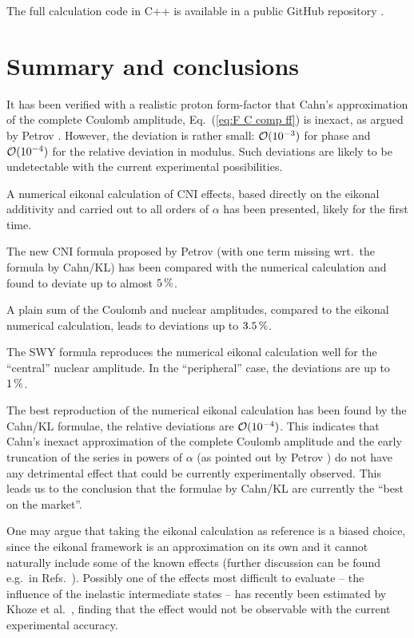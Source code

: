 \documentclass{appolb}
\def\un#1{\,{\rm #1}}
\begin{document}
The full calculation code in C++ is available in a public GitHub repository \cite{code}.




\section{Summary and conclusions}
\label{sec:summary}

It has been verified with a realistic proton form-factor that Cahn's approximation of the complete Coulomb amplitude, Eq.~(\ref{eq:F C comp ff}) is inexact, as argued by Petrov \cite{petrov2018}. However, the deviation is rather small: ${\cal O}(10^{-3})$ for phase and ${\cal O}(10^{-4})$ for the relative deviation in modulus. Such deviations are likely to be undetectable with the current experimental possibilities.

A numerical eikonal calculation of CNI effects, based directly on the eikonal additivity and carried out to all orders of $\alpha$ has been presented, likely for the first time.

The new CNI formula proposed by Petrov \cite{petrov2018} (with one term missing wrt.~the formula by Cahn/KL) has been compared with the numerical calculation and found to deviate up to almost $5\un{\%}$.

A plain sum of the Coulomb and nuclear amplitudes, compared to the eikonal numerical calculation, leads to deviations up to $3.5\un{\%}$.

The SWY formula reproduces the numerical eikonal calculation well for the ``central'' nuclear amplitude. In the ``peripheral'' case, the deviations are up to $1\un{\%}$.

The best reproduction of the numerical eikonal calculation has been found by the Cahn/KL formulae, the relative deviations are ${\cal O}(10^{-4})$. This indicates that Cahn's inexact approximation of the complete Coulomb amplitude and the early truncation of the series in powers of $\alpha$ (as pointed out by Petrov \cite{petrov2019,petrov2020}) do not have any detrimental effect that could be currently experimentally observed. This leads us to the conclusion that the formulae by Cahn/KL are currently the ``best on the market''.

One may argue that taking the eikonal calculation as reference is a biased choice, since the eikonal framework is an approximation on its own and it cannot naturally include some of the known effects (further discussion can be found e.g.~in Refs.~\cite{thesis,petrov2018,kmr2019}). Possibly one of the effects most difficult to evaluate -- the influence of the inelastic intermediate states -- has recently been estimated by Khoze et al.~\cite{kmr2019}, finding that the effect would not be observable with the current experimental accuracy.
\end{document}
